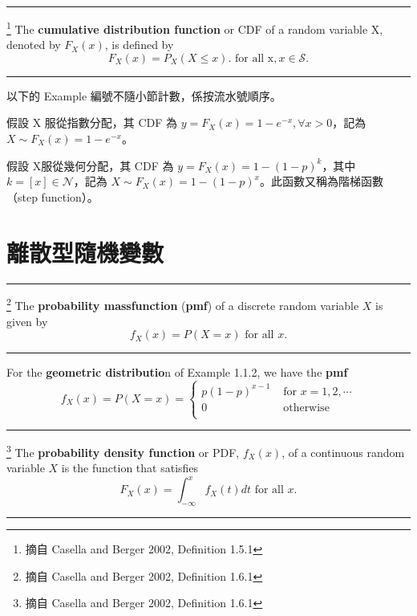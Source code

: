 \noindent \rule{\textwidth}{0.2pt}
\begin{de}\footnote{摘自 {\C Casella and Berger 2002, Definition 1.5.1}} %
{\C The \textbf{cumulative distribution function}  or CDF of a random variable X, denoted by $F_X(x)$,
is defined by}
\[F_X(x)=P_X(X \leq x). \mbox{ for all x}, x\in \mathcal{S}.\]
 \rule{\textwidth}{0.2pt}
\end{de}
\noindent 以下的 {\E Example} 編號不隨小節計數，係按流水號順序。
\begin{ex}[指數分配隨機變數的呈現] %
假設 {\C X} 服從指數分配，其 {\C CDF} 為 $y=F_X(x)=1-e^{-x}, \forall x>0$，記為 $X\sim F_X(x)=1-e^{-x}$。
\end{ex}

\begin{ex}[幾何分配隨機變數的呈現] %
假設 {\C X}服從幾何分配，其 {\C CDF} 為 $y=F_X(x)=1-(1-p)^k$，其中 $k=[x]\in \mathcal{N}$，記為 $X\sim F_X(x)=1-(1-p)^x$。此函數又稱為階梯函數（{\C step function}）。
\end{ex}


\section{{\MB 離散型隨機變數}}
\noindent \rule{\textwidth}{0.2pt}
\begin{de}\footnote{摘自 {\C Casella and Berger 2002, Definition 1.6.1}} %
{\C The \textbf{probability massfunction} (\textbf{pmf}) of a discrete random variable $X$ is given by}
\[f_X(x)=P(X=x) \mbox{ for all } x.\]
\noindent \rule{\textwidth}{0.2pt}
\end{de}
\bigskip
 
\begin{ex} %
{\C For the \textbf{geometric distributio}n of Example 1.1.2, we have the \textbf{pmf}}
\[f_X(x)=P(X=x)=\left\{\begin{array}{ll} p(1-p)^{x-1}  & \mbox{ for } x=1, 2, \cdots \\
                                              0        & \mbox{ otherwise } \\ \end{array}\right.\]
\end{ex}
\bigskip
\noindent \rule{\textwidth}{0.2pt}
\begin{de}\footnote{摘自 {\C Casella and Berger 2002, Definition 1.6.1}}  %
{\C The \textbf{probability density function} or PDF, $f_X(x)$, of a continuous random variable $X$ is the function that
satisfies}
\[F_X(x)=\int_{-\infty}^x f_X(t)dt \mbox{ for all } x.\]
\noindent \rule{\textwidth}{0.2pt}
\end{de}
\bigskip

